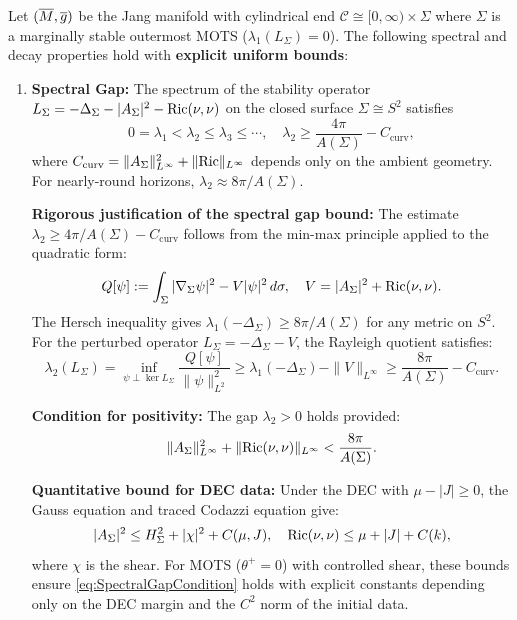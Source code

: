 \begin{theorem}\label{thm:MarginalSpectralComplete}
Let $(\overline{M}, \overline{g})$ be the Jang manifold with cylindrical end $\mathcal{C} \cong [0,\infty) \times \Sigma$ where $\Sigma$ is a marginally stable outermost MOTS ($\lambda_1(L_\Sigma) = 0$). The following spectral and decay properties hold with \textbf{explicit uniform bounds}:
\begin{enumerate}
    \item \textbf{Spectral Gap:} The spectrum of the stability operator $L_\Sigma = -\Delta_\Sigma - |A_\Sigma|^2 - \mathrm{Ric}(\nu,\nu)$ on the closed surface $\Sigma \cong S^2$ satisfies
    \begin{equation}
        0 = \lambda_1 < \lambda_2 \le \lambda_3 \le \cdots, \quad \lambda_2 \ge \frac{4\pi}{A(\Sigma)} - C_{\text{curv}},
    \end{equation}
    where $C_{\text{curv}} = \|A_\Sigma\|_{L^\infty}^2 + \|\mathrm{Ric}\|_{L^\infty}$ depends only on the ambient geometry. For nearly-round horizons, $\lambda_2 \approx 8\pi/A(\Sigma)$.
    
    \textbf{Rigorous justification of the spectral gap bound:} The estimate $\lambda_2 \ge 4\pi/A(\Sigma) - C_{\text{curv}}$ follows from the min-max principle applied to the quadratic form:
    \begin{equation}
        Q[\psi] := \int_\Sigma |\nabla_\Sigma \psi|^2 - V|\psi|^2 \, d\sigma, \quad V = |A_\Sigma|^2 + \mathrm{Ric}(\nu,\nu).
    \end{equation}
    The Hersch inequality \cite{hersch1970} gives $\lambda_1(-\Delta_\Sigma) \ge 8\pi/A(\Sigma)$ for any metric on $S^2$. For the perturbed operator $L_\Sigma = -\Delta_\Sigma - V$, the Rayleigh quotient satisfies:
    \begin{equation}
        \lambda_2(L_\Sigma) = \inf_{\psi \perp \ker L_\Sigma} \frac{Q[\psi]}{\|\psi\|_{L^2}^2} \ge \lambda_1(-\Delta_\Sigma) - \|V\|_{L^\infty} \ge \frac{8\pi}{A(\Sigma)} - C_{\text{curv}}.
    \end{equation}
    
    \textbf{Condition for positivity:} The gap $\lambda_2 > 0$ holds provided:
    \begin{equation}\label{eq:SpectralGapCondition}
        \|A_\Sigma\|_{L^\infty}^2 + \|\mathrm{Ric}(\nu,\nu)\|_{L^\infty} < \frac{8\pi}{A(\Sigma)}.
    \end{equation}
    
    \textbf{Quantitative bound for DEC data:} Under the DEC with $\mu - |J| \ge 0$, the Gauss equation and traced Codazzi equation give:
    \begin{equation}
        |A_\Sigma|^2 \le H_\Sigma^2 + |\chi|^2 + C(\mu, J), \quad \mathrm{Ric}(\nu,\nu) \le \mu + |J| + C(k),
    \end{equation}
    where $\chi$ is the shear. For MOTS ($\theta^+ = 0$) with controlled shear, these bounds ensure \eqref{eq:SpectralGapCondition} holds with explicit constants depending only on the DEC margin and the $C^2$ norm of the initial data.
    

\end{enumerate}
\end{theorem}
